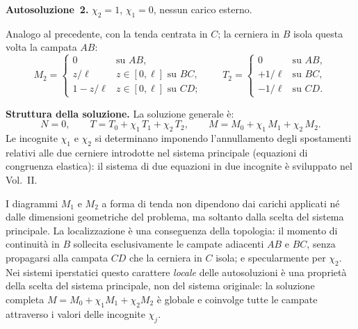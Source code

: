 \medskip
\noindent\textbf{Autosoluzione~2.}
$\chi_2 = 1$, $\chi_1 = 0$, nessun carico esterno.

Analogo al precedente, con la tenda centrata in $C$;
la cerniera in $B$ isola questa volta la campata $AB$:
\[
M_2 = \begin{cases}
0 & \text{su } AB, \\[4pt]
z/\ell & z \in [0,\ell] \text{ su } BC, \\[4pt]
1 - z/\ell & z \in [0,\ell] \text{ su } CD;
\end{cases}
\qquad
T_2 = \begin{cases}
0 & \text{su } AB, \\[4pt]
+1/\ell & \text{su } BC, \\[4pt]
-1/\ell & \text{su } CD.
\end{cases}
\]

\medskip
\noindent\textbf{Struttura della soluzione.}
La soluzione generale è:
\begin{equation}
\label{eq:sovrapposizione_tc}
N = 0, \qquad
T = T_0 + \chi_1\,T_1 + \chi_2\,T_2, \qquad
M = M_0 + \chi_1\,M_1 + \chi_2\,M_2.
\end{equation}
Le incognite $\chi_1$ e $\chi_2$ si determinano imponendo
l'annullamento degli spostamenti relativi alle due cerniere
introdotte nel sistema principale (equazioni di congruenza
elastica): il sistema di due equazioni in due incognite
è sviluppato nel Vol.~II.

\begin{oss}
I diagrammi $M_1$ e $M_2$ a forma di tenda non
dipendono dai carichi applicati né dalle dimensioni
geometriche del problema, ma soltanto dalla scelta
del sistema principale. La localizzazione è una
conseguenza della topologia: il momento di continuità
in $B$ sollecita esclusivamente le campate adiacenti
$AB$ e $BC$, senza propagarsi alla campata $CD$
che la cerniera in $C$ isola; e specularmente
per $\chi_2$.
Nei sistemi iperstatici questo carattere \emph{locale}
delle autosoluzioni è una proprietà della scelta
del sistema principale, non del sistema originale:
la soluzione completa $M = M_0 + \chi_1 M_1 + \chi_2 M_2$
è globale e coinvolge tutte le campate attraverso
i valori delle incognite $\chi_j$.
\end{oss}








